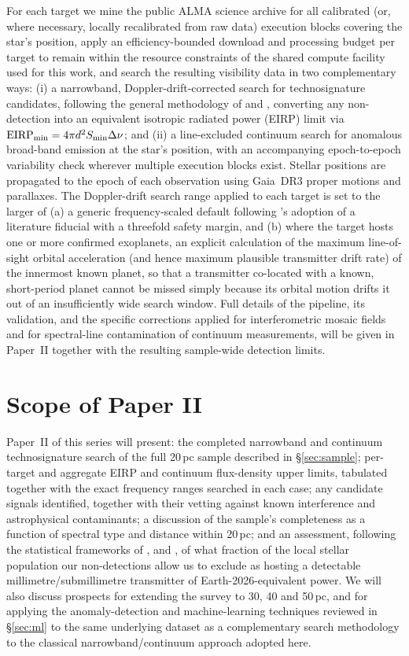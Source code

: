 \documentclass{openjournal}
\begin{document}
For each target we mine the public ALMA science archive for all calibrated (or,
where necessary, locally recalibrated from raw data) execution blocks covering
the star's position, apply an efficiency-bounded download and processing budget
per target to remain within the resource constraints of the shared compute
facility used for this work, and search the resulting visibility data in two
complementary ways: (i) a narrowband, Doppler-drift-corrected search for
technosignature candidates, following the general methodology of
\citet{Mason2024} and \citet{Enriquez2017}, converting any non-detection into an
equivalent isotropic radiated power (EIRP) limit via
$\mathrm{EIRP_{min}} = 4\pi d^{2} S_{\rm min} \Delta\nu$; and (ii) a
line-excluded continuum search for anomalous broad-band emission at the star's
position, with an accompanying epoch-to-epoch variability check wherever
multiple execution blocks exist. Stellar positions are propagated to the epoch
of each observation using Gaia~DR3 proper motions and parallaxes. The
Doppler-drift search range applied to each target is set to the larger of (a) a
generic frequency-scaled default following \citet{Mason2024}'s adoption of a
literature fiducial with a threefold safety margin, and (b) where the target
hosts one or more confirmed exoplanets, an explicit calculation of the maximum
line-of-sight orbital acceleration (and hence maximum plausible transmitter
drift rate) of the innermost known planet, so that a transmitter co-located with
a known, short-period planet cannot be missed simply because its orbital motion
drifts it out of an insufficiently wide search window. Full details of the
pipeline, its validation, and the specific corrections applied for
interferometric mosaic fields and for spectral-line contamination of continuum
measurements, will be given in Paper~II together with the resulting sample-wide
detection limits.

\section{Scope of Paper II}
\label{sec:futurework}

Paper~II of this series will present: the completed narrowband and continuum
technosignature search of the full 20\,pc sample described in
\S\ref{sec:sample}; per-target and aggregate EIRP and continuum flux-density
upper limits, tabulated together with the exact frequency ranges searched in
each case; any candidate signals identified, together with their vetting against
known interference and astrophysical contaminants; a discussion of the sample's
completeness as a function of spectral type and distance within 20\,pc; and an
assessment, following the statistical frameworks of \citet{Wright2018},
\citet{Sheikh2020} and \citet{Margot2023}, of what fraction of the local stellar
population our non-detections allow us to exclude as hosting a detectable
millimetre/submillimetre transmitter of Earth-2026-equivalent power. We will
also discuss prospects for extending the survey to 30, 40 and 50\,pc, and for
applying the anomaly-detection and machine-learning techniques reviewed in
\S\ref{sec:ml} to the same underlying dataset as a complementary search
methodology to the classical narrowband/continuum approach adopted here.
\end{document}
